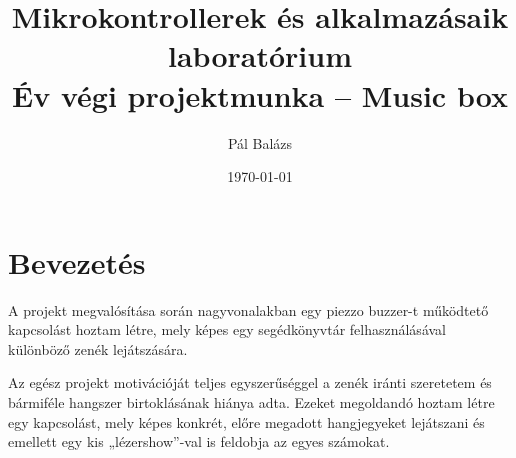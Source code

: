 \documentclass[12pt, a4paper]{article}
\title{Mikrokontrollerek és alkalmazásaik laboratórium \\Év végi projektmunka -- Music box}
\author{Pál Balázs}
\date{\today}
\newcommand{\q}[1]{„#1''} %
\begin{document}
\maketitle

\section{Bevezetés}
A projekt megvalósítása során nagyvonalakban egy piezzo buzzer-t működtető kapcsolást hoztam létre, mely képes egy segédkönyvtár felhasználásával különböző zenék lejátszására. \par
Az egész projekt motivációját teljes egyszerűséggel a zenék iránti szeretetem és bármiféle hangszer birtoklásának hiánya adta. Ezeket megoldandó hoztam létre egy kapcsolást, mely képes konkrét, előre megadott hangjegyeket lejátszani és emellett egy kis \q{lézershow}-val is feldobja az egyes számokat.
\end{document}
